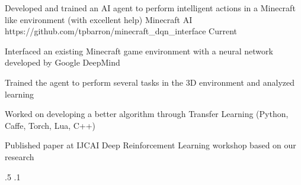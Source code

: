 \begin{cventries}

\vspace{-2.25em}
\myProject
{Developed and trained an AI agent to perform intelligent actions in a Minecraft like environment (with excellent help)} %
{Minecraft AI} %
{https://github.com/tpbarron/minecraft\_dqn\_interface} %
{Current} %
{ %
\begin{cvitems}
\item {Interfaced an existing Minecraft game environment with a neural network developed by Google DeepMind}
\item {Trained the agent to perform several tasks in the 3D environment and analyzed learning}
\item {Worked on developing a better algorithm through Transfer Learning (Python, Caffe, Torch, Lua, C++)}
\item {Published paper at IJCAI Deep Reinforcement Learning workshop based on our research}
\end{cvitems}
}
{.5}
{.1}



\end{cventries}